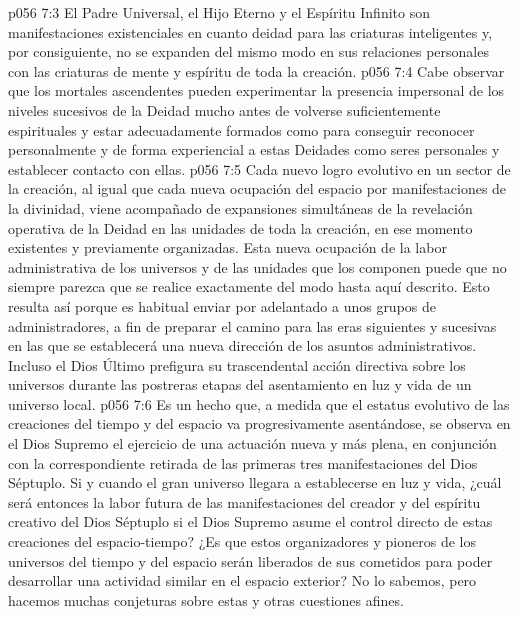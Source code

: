 \vs p056 7:3 \pc El Padre Universal, el Hijo Eterno y el Espíritu Infinito son manifestaciones existenciales en cuanto deidad para las criaturas inteligentes y, por consiguiente, no se expanden del mismo modo en sus relaciones personales con las criaturas de mente y espíritu de toda la creación.
\vs p056 7:4 \pc Cabe observar que los mortales ascendentes pueden experimentar la presencia impersonal de los niveles sucesivos de la Deidad mucho antes de volverse suficientemente espirituales y estar adecuadamente formados como para conseguir reconocer personalmente y de forma experiencial a estas Deidades como seres personales y establecer contacto con ellas.
\vs p056 7:5 Cada nuevo logro evolutivo en un sector de la creación, al igual que cada nueva ocupación del espacio por manifestaciones de la divinidad, viene acompañado de expansiones simultáneas de la revelación operativa de la Deidad en las unidades de toda la creación, en ese momento existentes y previamente organizadas. Esta nueva ocupación de la labor administrativa de los universos y de las unidades que los componen puede que no siempre parezca que se realice exactamente del modo hasta aquí descrito. Esto resulta así porque es habitual enviar por adelantado a unos grupos de administradores, a fin de preparar el camino para las eras siguientes y sucesivas en las que se establecerá una nueva dirección de los asuntos administrativos. Incluso el Dios Último prefigura su trascendental acción directiva sobre los universos durante las postreras etapas del asentamiento en luz y vida de un universo local.
\vs p056 7:6 Es un hecho que, a medida que el estatus evolutivo de las creaciones del tiempo y del espacio va progresivamente asentándose, se observa en el Dios Supremo el ejercicio de una actuación nueva y más plena, en conjunción con la correspondiente retirada de las primeras tres manifestaciones del Dios Séptuplo. Si y cuando el gran universo llegara a establecerse en luz y vida, ¿cuál será entonces la labor futura de las manifestaciones del creador y del espíritu creativo del Dios Séptuplo si el Dios Supremo asume el control directo de estas creaciones del espacio\hyp{}tiempo? ¿Es que estos organizadores y pioneros de los universos del tiempo y del espacio serán liberados de sus cometidos para poder desarrollar una actividad similar en el espacio exterior? No lo sabemos, pero hacemos muchas conjeturas sobre estas y otras cuestiones afines.
